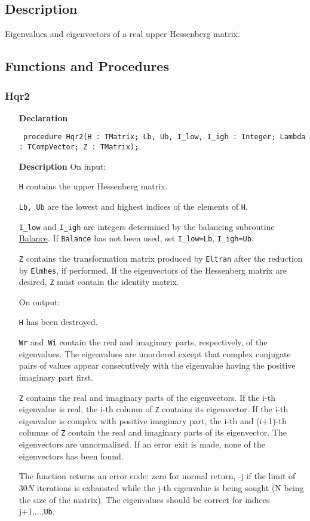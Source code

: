 \documentclass[12pt,a4paper,oneside]{report}
\newcommand{\declarationitem}[1]{\textbf{#1}}
\newcommand{\descriptiontitle}[1]{\textbf{#1}}
\newcommand{\code}[1]{\texttt{#1}}
\begin{document}
\subsection{Description}
Eigenvalues and eigenvectors of a real upper Hessenberg matrix.
\subsection{Functions and Procedures}
\subsubsection{Hqr2}
\label{uhqr2-Hqr2}
\begin{itemize}\item[\declarationitem{Declaration}\hfill]
	\begin{flushleft}
		\code{
			procedure Hqr2(H : TMatrix; Lb, Ub, I{\_}low, I{\_}igh : Integer; Lambda : TCompVector; Z : TMatrix);}
		
	\end{flushleft}
	
	\par
	\item[\descriptiontitle{Description}]
	On input:
	
	\code{H} contains the upper Hessenberg matrix.
	
	\code{Lb, Ub} are the lowest and highest indices of the elements of \code{H}.
	
	\code{I{\_}low} and \code{I{\_}igh} are integers determined by the balancing subroutine \hyperref[ubalance]{Balance}. If \code{Balance} has not been used, set \code{I{\_}low=Lb}, \code{I{\_}igh=Ub}.
	
	\code{Z} contains the transformation matrix produced by \code{Eltran} after the reduction by \code{Elmhes}, if performed. If the eigenvectors of the Hessenberg matrix are desired, \code{Z} must contain the identity matrix.
	
	On output:
	
	\code{H} has been destroyed.
	
	\code{Wr} and\code{ Wi} contain the real and imaginary parts, respectively, of the eigenvalues. The eigenvalues are unordered except that complex conjugate pairs of values appear consecutively with the eigenvalue having the positive imaginary part first.
	
	\code{Z} contains the real and imaginary parts of the eigenvectors. If the i{-}th eigenvalue is real, the i{-}th column of \code{Z} contains its eigenvector. If the i{-}th eigenvalue is complex with positive imaginary part, the i{-}th and (i+1){-}th columns of \code{Z} contain the real and imaginary parts of its eigenvector. The eigenvectors are unnormalized. If an error exit is made, none of the eigenvectors has been found.
	
	The function returns an error code: zero for normal return, {-}j if the limit of $30N$ iterations is exhausted while the j{-}th eigenvalue is being sought (N being the size of the matrix). The eigenvalues should be correct for indices j+1,...,\code{Ub}.
	
\end{itemize}
\end{document}
